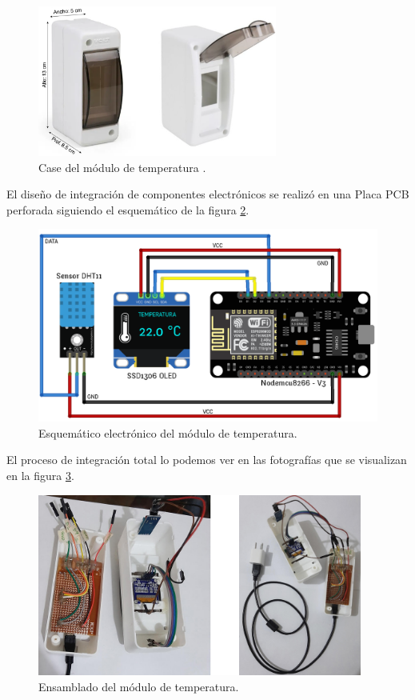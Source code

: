 \begin{figure}[htpb]
\centering 
\includegraphics[width=0.7\textwidth]{./Figures/casetemp.png}
\caption{Case del módulo de temperatura \protect\footnotemark.}
\label{fig:casetemp}
\end{figure}


El diseño de integración de componentes electrónicos se realizó en una Placa PCB perforada siguiendo el esquemático de la figura \ref{fig:citemp}.

\begin{figure}[htpb]
\centering 
\includegraphics[width=1.0\textwidth]{./Figures/ci-temp.png}
\caption{Esquemático electrónico del módulo de temperatura. }
\label{fig:citemp}
\end{figure}

El proceso de integración total lo podemos ver en las fotografías que se visualizan en la figura \ref{fig:entemp}.

\begin{figure}[htpb]
\centering 
\includegraphics[width=0.95\textwidth]{./Figures/temperatura.jpg}
\caption{Ensamblado del módulo de temperatura. }
\label{fig:entemp}
\end{figure}


